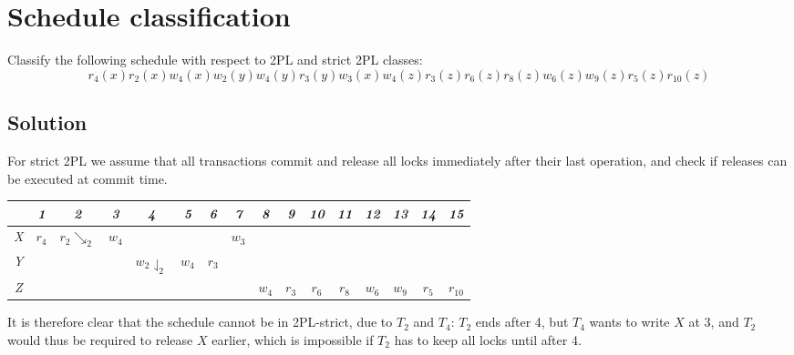 \documentclass[12pt, a4paper]{report}
\begin{document}
    \newpage

    \section{Schedule classification}
        Classify the following schedule with respect to 2PL and strict 2PL classes: 
        \[r_4(x) r_2(x) w_4(x) w_2(y) w_4(y) r_3(y) w_3(x) w_4(z) r_3(z) r_6(z) r_8(z) w_6(z) w_9(z) r_5(z) r_10(z)\]
    \subsection*{Solution}
        For strict 2PL we assume that all transactions commit and release all locks immediately after their last operation, and check if releases can be executed at commit time.
        \begin{table}[H]
            \centering
            \begin{tabular}{c|ccccccccccccccc}
                       & \textit{1} & \textit{2} & \textit{3} & \textit{4} & \textit{5} & \textit{6} & \textit{7} & \textit{8} & \textit{9} & \textit{10} & \textit{11} & \textit{12} & \textit{13} & \textit{14} & \textit{15} \\ \hline
            \textit{X} & $r_4$      & $r_2\searrow _2$          & $w_4$      &                              &            &            & $w_3$      &            &            &             &             &             &             &             &             \\
            \textit{Y} &            &                           &            & $w_2\downharpoonleft_2$      & $w_4$      & $r_3$      &            &            &            &             &             &             &             &             &             \\
            \textit{Z} &            &                           &            &                              &            &            &            & $w_4$      & $r_3$      & $r_6$       & $r_8$       & $w_6$       & $w_9$       & $r_5$       & $r_{10}$     
            \end{tabular}%
        \end{table}
        It is therefore clear that the schedule cannot be in 2PL-strict, due to $T_2$ and $T_4$: $T_2$ ends after 4, but $T_4$ wants to write $X$ at 3, and $T_2$ would thus be 
        required to release $X$ earlier, which is impossible if $T_2$ has to keep all locks until after 4.
\end{document}
